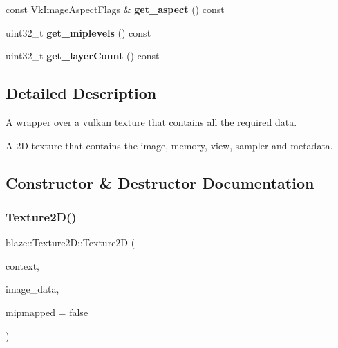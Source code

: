 \begin{Indent}
\begin{DoxyCompactItemize}
\mbox{\label{classblaze_1_1Texture2D_a1e19506b9f45670b71432a4b0fb90269}} 
const Vk\+Image\+Aspect\+Flags \& {\bfseries get\+\_\+aspect} () const
\item 
\mbox{\label{classblaze_1_1Texture2D_a76d9dc00563db38ebd45a0e8a36c10e8}} 
uint32\+\_\+t {\bfseries get\+\_\+miplevels} () const
\item 
\mbox{\label{classblaze_1_1Texture2D_a83a2c19482249263e2f1cec9e9f4698e}} 
uint32\+\_\+t {\bfseries get\+\_\+layer\+Count} () const
\end{DoxyCompactItemize}
\end{Indent}


\subsection{Detailed Description}
A wrapper over a vulkan texture that contains all the required data. 

A 2D texture that contains the image, memory, view, sampler and metadata. 

\subsection{Constructor \& Destructor Documentation}
\mbox{\label{classblaze_1_1Texture2D_ad3f7b6a52513786666cc64281a098d12}} 
\subsubsection{\texorpdfstring{Texture2\+D()}{Texture2D()}}
{\footnotesize\ttfamily blaze\+::\+Texture2\+D\+::\+Texture2D (\begin{DoxyParamCaption}\item[{const \hyperlink{classblaze_1_1Context}{Context} $\ast$}]{context,  }\item[{const \hyperlink{structblaze_1_1ImageData2D}{Image\+Data2D} \&}]{image\+\_\+data,  }\item[{bool}]{mipmapped = {\ttfamily false} }\end{DoxyParamCaption})}



